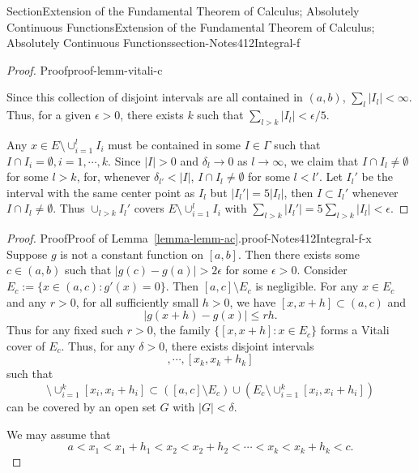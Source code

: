 \documentclass[oneside,10pt,]{article}
\newcommand{\xreffont}{\relax}
\numberwithin{equation}{section}
\begin{document}
\begin{sectionptx}{Section}{Extension of the Fundamental Theorem of Calculus; Absolutely Continuous Functions}{}{Extension of the Fundamental Theorem of Calculus; Absolutely Continuous Functions}{}{}{section-Notes412Integral-f}
\begin{proof}{Proof}{}{proof-lemm-vitali-c}
\par
Since this collection of disjoint intervals are all contained in \((a, b)\), \(\sum_{l} |I_{l}| < \infty\). Thus, for a given \(\epsilon > 0\), there exists \(k\) such that \(\sum_{l> k} |I_{l}| <  \epsilon/5\).%
\par
Any \(x\in E\setminus \cup_{i=1}^{l}I_{i}\) must be contained in some \(I\in \Gamma\) such that \(I \cap I_{i}=\emptyset, i=1,\cdots, k\). Since \(|I| > 0\) and \(\delta_{l}\to 0\) as \(l\to\infty\), we claim that \(I\cap I_{l}\ne \emptyset\) for some \(l > k\), for, whenever \(\delta_{l'} < |I|\), \(I\cap I_{l}\ne \emptyset\) for some \(l < l'\). Let \(I_{l}'\) be the interval with the same center point as \(I_{l}\) but \(|I_{l}'|=5 |I_{l}|\), then \(I\subset I_{l}'\) whenever \(I\cap I_{l}\ne \emptyset\). Thus \(\cup_{l > k} I_{l}'\) covers \(E\setminus \cup_{i=1}^{l}I_{i}\) with \(\sum_{l > k}  |I_{l}'| =5 \sum_{l > k}  |I_{l}|< \epsilon\).%
\end{proof}
\begin{proof}{Proof}{Proof of Lemma~{\xreffont\ref*{lemma-lemm-ac}}.}{proof-Notes412Integral-f-x}
Suppose \(g\) is not a constant function on \([a, b]\). Then there exists some \(c\in (a, b)\) such that \(|g(c)-g(a)| > 2\epsilon\) for some \(\epsilon  > 0\). Consider \(E_{c} :=\{x\in (a, c): g'(x)=0\}\). Then \([a, c]\setminus E_{c}\) is negligible. For any \(x\in E_{c}\) and any \(r > 0\), for all sufficiently small \(h > 0\), we have \([x, x+h]\subset (a, c)\) and%
\begin{equation*}
|g(x+h)-g(x)|\le r h.
\end{equation*}
Thus for any fixed such \(r > 0\), the family \(\{[x, x+h]: x\in E_{c}\}\) forms a Vitali cover of \(E_{c}\). Thus, for any \(\delta > 0\), there exists disjoint intervals%
\begin{equation*}
[x_{1}, x_{1}+h_{1}], \cdots, [x_{k}, x_{k}+h_{k}]
\end{equation*}
such that%
\begin{equation*}
[a, c] \setminus  \cup_{i=1}^{k} [x_{i}, x_{i}+h_{i}]
\subset \left([a, c]\setminus E_{c}\right) \cup \left( E_{c}\setminus \cup_{i=1}^{k} [x_{i}, x_{i}+h_{i}]\right)
\end{equation*}
can be covered by  an open set \(G\) with \(|G| < \delta\).%
\par
We may assume that%
\begin{equation*}
a < x_{1} < x_{1}+h_{1} < x_{2} < x_{2}+h_{2} < \cdots < x_{k} < x_{k}+h_{k} < c.
\end{equation*}

\end{proof}
\end{sectionptx}
\end{document}

